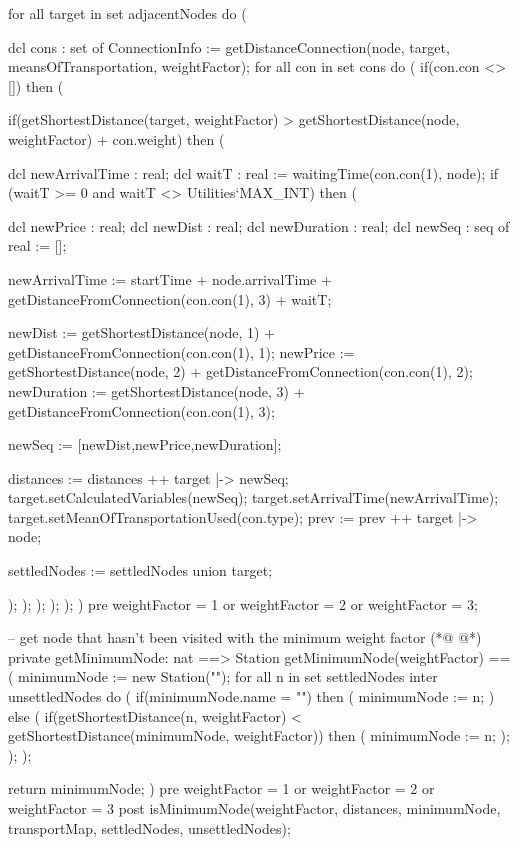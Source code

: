 \begin{vdmpp}[breaklines=true]
  for all target in set adjacentNodes do (
  
   dcl cons : set of ConnectionInfo := getDistanceConnection(node, target, meansOfTransportation, weightFactor);
   for all con in set cons do (
    if(con.con <> []) then (
    
     if(getShortestDistance(target, weightFactor) > getShortestDistance(node, weightFactor) + con.weight) then (
      
      dcl newArrivalTime : real;
      dcl waitT : real := waitingTime(con.con(1), node);
      if (waitT >= 0 and waitT <> Utilities`MAX_INT) then (
       
       dcl newPrice : real;
       dcl newDist : real;
       dcl newDuration : real;
       dcl newSeq : seq of real := [];
       
       newArrivalTime := startTime + node.arrivalTime + getDistanceFromConnection(con.con(1), 3) + waitT;
      
       newDist := getShortestDistance(node, 1) + getDistanceFromConnection(con.con(1), 1); 
       newPrice := getShortestDistance(node, 2) + getDistanceFromConnection(con.con(1), 2); 
       newDuration := getShortestDistance(node, 3) + getDistanceFromConnection(con.con(1), 3);
      
       newSeq := [newDist,newPrice,newDuration];
       
       distances := distances ++ {target |-> newSeq};
       target.setCalculatedVariables(newSeq);
       target.setArrivalTime(newArrivalTime);
       target.setMeanOfTransportationUsed(con.type);
       prev := prev ++ {target |-> node};
       
       settledNodes := settledNodes union {target}; 
       
      );
     );
    );
   );
  );
 )
 pre weightFactor = 1 or weightFactor = 2 or weightFactor = 3;
 
 -- get node that hasn't been visited with the minimum weight factor
(*@
\label{getMinimumNode:169}
@*)
 private getMinimumNode: nat ==> Station 
 getMinimumNode(weightFactor) == 
 (
  minimumNode := new Station("");
  for all n in set settledNodes inter unsettledNodes do (
   if(minimumNode.name = "") then (
    minimumNode := n;
   )
   else (
    if(getShortestDistance(n, weightFactor) < getShortestDistance(minimumNode, weightFactor)) then (
     minimumNode := n;
    ); 
   );
  );
  
  return minimumNode;
 )
 pre weightFactor = 1 or weightFactor = 2 or weightFactor = 3
 post isMinimumNode(weightFactor, distances, minimumNode, transportMap, settledNodes, unsettledNodes);
 

\end{vdmpp}
